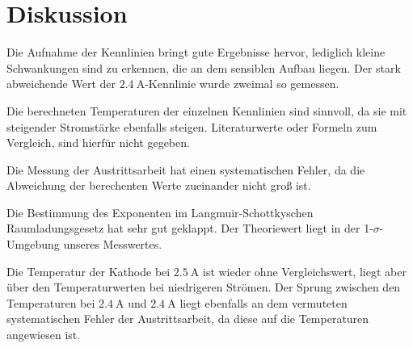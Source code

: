 \section{Diskussion}
\label{sec:Diskussion}
Die Aufnahme der Kennlinien bringt gute Ergebnisse hervor, lediglich kleine
Schwankungen sind zu erkennen, die an dem sensiblen Aufbau liegen. Der stark abweichende
Wert der $\SI{2.4}{\ampere}$-Kennlinie wurde zweimal so gemessen.

Die berechneten Temperaturen der einzelnen Kennlinien sind sinnvoll, da sie mit
steigender Stromstärke ebenfalls steigen. Literaturwerte oder Formeln zum Vergleich,
sind hierfür nicht gegeben.

Die Messung der Austrittsarbeit hat einen systematischen Fehler, da die Abweichung
der berechenten Werte zueinander nicht groß ist.

Die Bestimmung des Exponenten im Langmuir-Schottkyschen Raumladungsgesetz hat
sehr gut geklappt. Der Theoriewert liegt in der 1-$σ$-Umgebung unseres Messwertes.

Die Temperatur der Kathode bei $\SI{2.5}{\ampere}$ ist wieder ohne Vergleichswert,
liegt aber über den Temperaturwerten bei niedrigeren Strömen. Der Sprung zwischen
den Temperaturen bei $\SI{2.4}{\ampere}$ und $\SI{2.4}{\ampere}$ liegt ebenfalls
an dem vermuteten systematischen Fehler der Austrittsarbeit, da diese auf die
Temperaturen angewiesen ist.
